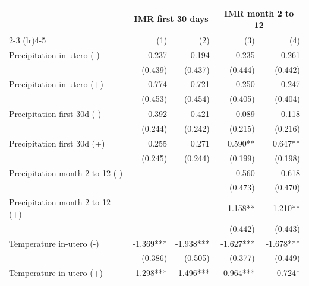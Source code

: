 \begin{tabular}{lrrrr}
\toprule
                                            &      \multicolumn{2}{c}{IMR first 30 days}     &   \multicolumn{2}{c}{IMR month 2 to 12}      \\ 
\cmidrule(lr){2-3} \cmidrule(lr){4-5} 
                                            &        (1) &   (2)  &  (3)  &  (4)      \\ 
\midrule 
Precipitation in-utero (-)                  &       0.237  &       0.194 &      -0.235  &       -0.261   \\  
                                            &     (0.439)  &     (0.437) &     (0.444)  &      (0.442)   \\  
Precipitation in-utero (+)                  &       0.774  &       0.721 &      -0.250  &       -0.247   \\  
                                            &     (0.453)  &     (0.454) &     (0.405)  &      (0.404)   \\  
Precipitation first 30d (-)                 &      -0.392  &      -0.421 &      -0.089  &       -0.118   \\
                                            &     (0.244)  &     (0.242) &     (0.215)  &      (0.216)   \\
Precipitation first 30d (+)                 &       0.255  &       0.271 &     0.590**  &      0.647**   \\
                                            &     (0.245)  &     (0.244) &     (0.199)  &      (0.198)   \\
Precipitation month 2 to 12  (-)            &              &             &      -0.560  &       -0.618   \\ 
                                            &              &             &     (0.473)  &      (0.470)   \\ 
Precipitation month 2 to 12 (+)             &              &             &     1.158**  &      1.210**   \\ 
                                            &              &             &     (0.442)  &      (0.443)   \\ 
Temperature in-utero   (-)                  &   -1.369***  &   -1.938*** &   -1.627***  &    -1.678***   \\
                                            &     (0.386)  &     (0.505) &     (0.377)  &      (0.449)   \\
Temperature in-utero  (+)                   &    1.298***  &    1.496*** &    0.964***  &       0.724*   \\

\end{tabular}

